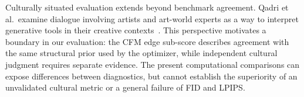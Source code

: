 Culturally situated evaluation extends beyond benchmark agreement. Qadri et al.\ examine dialogue involving artists and art-world experts as a way to interpret generative tools in their creative contexts~\cite{qadri2024}. This perspective motivates a boundary in our evaluation: the CFM edge sub-score describes agreement with the same structural prior used by the optimizer, while independent cultural judgment requires separate evidence. The present computational comparisons can expose differences between diagnostics, but cannot establish the superiority of an unvalidated cultural metric or a general failure of FID and LPIPS.
